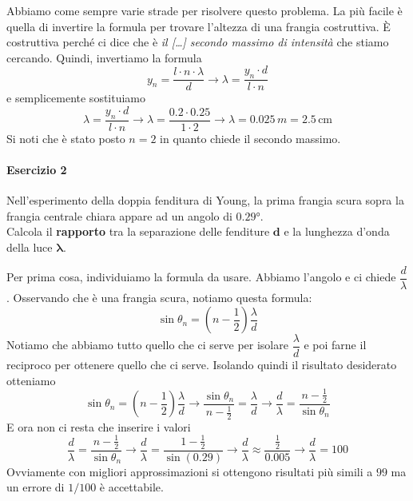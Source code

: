 Abbiamo come sempre varie strade per risolvere questo problema. La più facile è quella di invertire
la formula per trovare l'altezza di una frangia costruttiva. È costruttiva perché ci dice che è
\emph{il [\ldots] secondo massimo di intensità} che stiamo cercando. Quindi, invertiamo la formula
\begin{equation*}
y_n = \frac{l\cdot n\cdot\lambda}{d} \rightarrow \lambda = \frac{y_n\cdot d}{l\cdot n}
\end{equation*}
e semplicemente sostituiamo
\begin{equation*}
\lambda = \frac{y_n\cdot d}{l\cdot n} \rightarrow \lambda = \frac{0.2\cdot0.25}{1\cdot2} \rightarrow
\lambda = \boxed{0.025\,m} = \boxed{2.5\,\text{cm}}
\end{equation*}
Si noti che è stato posto $n=2$ in quanto chiede il secondo massimo.

\paragraph{Esercizio 2}
Nell'esperimento della doppia fenditura di Young, la prima frangia scura sopra la frangia centrale 
chiara appare ad un angolo di $\ang{0.29}$.\\
Calcola il \textbf{rapporto} tra la separazione delle fenditure $\boldsymbol{d}$ e la lunghezza 
d'onda della luce $\boldsymbol{\lambda}$.
\divisor

Per prima cosa, individuiamo la formula da usare. Abbiamo l'angolo e ci chiede $\dfrac{d}{\lambda}$.
Osservando che è una frangia scura, notiamo questa formula:
\begin{equation*}
\sin\theta_n = \left(n-\frac{1}{2}\right)\frac{\lambda}{d}
\end{equation*}
Notiamo che abbiamo tutto quello che ci serve per isolare $\dfrac{\lambda}{d}$ e poi farne il 
reciproco per ottenere quello che ci serve. Isolando quindi il risultato desiderato otteniamo
\begin{equation*}
\sin\theta_n = \left(n-\frac{1}{2}\right)\frac{\lambda}{d} \rightarrow
\frac{\sin\theta_n}{n-\frac{1}{2}} = \frac{\lambda}{d} \rightarrow
\frac{d}{\lambda} = \frac{n-\frac{1}{2}}{\sin\theta_n}
\end{equation*}
E ora non ci resta che inserire i valori
\begin{equation*}
\frac{d}{\lambda} = \frac{n-\frac{1}{2}}{\sin\theta_n} \rightarrow
\frac{d}{\lambda} = \frac{1-\frac{1}{2}}{\sin(0.29)} \rightarrow
\frac{d}{\lambda} \approx \frac{\frac{1}{2}}{0.005} \rightarrow
\frac{d}{\lambda} = \boxed{100}
\end{equation*}
Ovviamente con migliori approssimazioni si ottengono risultati più simili a $99$ ma un errore di
$1/100$ è accettabile.

